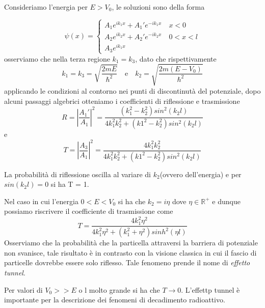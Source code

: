  \noindent Consideriamo l'energia per $E > V_0$, le soluzioni sono della forma 
 
 \begin{equation}
 	\psi(x) = \begin{cases}
 		A_1e^{ik_1x} + A_1'e^{-ik_1x} \quad x < 0\\
 		A_2e^{ik_2x} + A_2'e^{-ik_2x} \quad  0<x<l \\
 		A_3e^{ik_1x}
 	\end{cases}
 \end{equation}
 osserviamo che nella terza regione $k_1 = k_3$, dato che rispettivamente 
 \begin{equation*}
 	k_1 = k_3 = \sqrt{\frac{2mE}{\hbar^2}} \quad \text{e} \quad k_2 = \sqrt{\frac{2m(E-V_0)}{\hbar^2}}
 \end{equation*} 
 applicando le condizioni al contorno nei punti di discontinut\`a del potenziale, dopo alcuni passaggi algebrici otteniamo i coefficienti di riflessione e trasmissione 
 \begin{equation*}
 	R = \left |\frac{A_1'}{A_1} \right |^2 = \frac{(k_1^2 - k_2^2)sin^2(k_2l)}{4k_1^2k_2^2 + (k1^2-k_2^2)sin^2(k_2l)}
 \end{equation*}
 e
 \begin{equation*}
 	T = \left | \frac{A_3}{A_1} \right |^2 = \frac{4k_1^2k_2^2}{4k_1^2k_2^2 + (k1^2-k_2^2)sin^2(k_2l)}
 \end{equation*}
 \newpage 
 
 \noindent La probabilit\`a di riflessione oscilla al variare di $k_2$(ovvero dell'energia) e per $sin(k_2l) = 0 $ si ha T = 1.
 
 \noindent Nel caso in cui l'energia $0<E<V_0$ si ha che $k_2 = i\eta$ dove $\eta \in \mathbb{R}^+$ e dunque possiamo riscrivere il coefficiente di trasmissione come 
 \begin{equation*}
 	T = \frac{4k_1^2\eta^2}{4k_1^2\eta^2 + (k_1^2 + \eta^2)sinh^2(\eta l)}
 \end{equation*}
 Osserviamo che la probabilit\`a che la particella attraversi la barriera di potenziale non svanisce, tale risultato \`e in contrasto con la visione classica in cui il fascio di particelle dovrebbe essere solo riflesso. Tale fenomeno prende il nome di \textit{effetto tunnel}.
 \newline
 
 \noindent Per valori di $V_0 >> E$ o l molto grande si ha che $T \to 0$. L'effettp tunnel \`e importante per la descrizione dei fenomeni di decadimento radioattivo.
 

